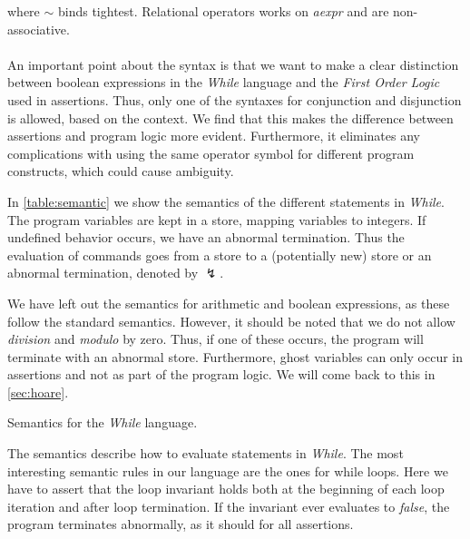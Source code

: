 where $\sim$ binds tightest.
Relational operators works on \textit{aexpr} and are non-associative.
\\~\\
An important point about the syntax is that we want to make a clear distinction between boolean expressions in the \textit{While} language and the \textit{First Order Logic} used in assertions. 
Thus, only one of the syntaxes for conjunction and disjunction is allowed, based on the context.
We find that this makes the difference between assertions and program logic more evident.
Furthermore, it eliminates any complications with using the same operator symbol for different program constructs, which could cause ambiguity.

In \cref{table:semantic} we show the semantics of the different statements in \textit{While}.
The program variables are kept in a store, mapping variables to integers.
If undefined behavior occurs, we have an abnormal termination.
Thus the evaluation of commands goes from a store to a (potentially new) store or an abnormal termination, denoted by $\lightning$.

We have left out the semantics for arithmetic and boolean expressions, as these follow the standard semantics.
However, it should be noted that we do not allow \textit{division} and \textit{modulo} by zero.
Thus, if one of these occurs, the program will terminate with an abnormal store.
Furthermore, ghost variables can only occur in assertions and not as part of the program logic. We will come back to this in \cref{sec:hoare}.

\begin{table}[h!]
\centering

\caption{Semantics for the \textit{While} language.}
\label{table:semantic}
\end{table}

The semantics describe how to evaluate statements in \textit{While}. The most interesting semantic rules in our language are the ones for while loops.
Here we have to assert that the loop invariant holds both at the beginning of each loop iteration and after loop termination.
If the invariant ever evaluates to \textit{false}, the program terminates abnormally, as it should for all assertions.

